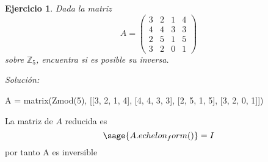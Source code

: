 \documentclass{amsart}
\newtheorem{ejer}{Ejercicio}
\def\z{\mathbb{Z}}
\begin{document}
\begin{ejer}
Dada la matriz 
\[ A =
	\left( \begin{array}{rrrr}
		3 & 2 & 1 & 4 \\
		4 & 4 & 3 & 3 \\
		2 & 5 & 1 & 5 \\
		3 & 2 & 0 & 1 
	\end{array}
	\right) 
	\]
sobre $\z _5$, encuentra si es posible su inversa.
\end{ejer}
{\it Soluci\'on:}

\begin{sageblock}
	A = matrix(Zmod(5), [[3, 2, 1, 4], [4, 4, 3, 3], [2, 5, 1, 5], [3, 2, 0, 1]])
\end{sageblock}

La matriz de $A$ reducida es
$$
	\sage{A.echelon_form()} = I
$$
por tanto A es inversible

\end{document}
